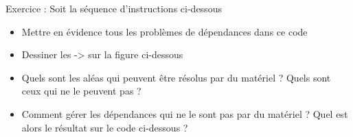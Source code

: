 %
\begin{Frame}{Exercice : Soit la séquence d'instructions ci-dessous}

\begin{block}{}
  \begin{itemize}
  \item Mettre en évidence tous les problèmes de dépendances dans ce
      code
	\item Dessiner les -> sur la figure ci-dessous
	\item Quels sont les aléas qui peuvent être résolus par du
      matériel ? Quels sont ceux qui ne le peuvent pas ?
	\item Comment gérer les dépendances qui ne le sont pas par du
      matériel ? Quel est alors le résultat sur le code ci-dessous ?
    \end{itemize}
  \end{block}

        \begin{center}
        \end{center}


\end{Frame}

